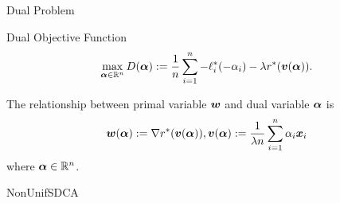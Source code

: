 \begin{frame}{Dual Problem}
\begin{block}{Dual Objective Function}
\begin{equation*}\label{eq:dual}
\max_{\bm{\alpha}\in \mathbb{R}^n} D(\bm{\alpha}):=\frac1n \sum_{i=1}^n -\ell_i^*(-\alpha_i) - \lambda r^*(\bm{v}(\bm{\alpha})).  
\end{equation*}
\end{block}
The relationship between primal variable $\bm{w}$ and dual variable $\bm{\alpha}$ is
\begin{equation*}\label{eq:wdualupdate}
    \bm{w}(\bm{\alpha}) := \nabla r^*(\bm{v}(\bm{\alpha})), \bm{v}(\bm{\alpha}):=\frac{1}{\lambda n} \sum_{i=1}^n \alpha_i\bm{x}_i
\end{equation*}
where $\bm{\alpha}\in \mathbb{R}^n$.
\end{frame}

\begin{frame}{NonUnifSDCA}
\begin{algorithm}[H]
    \label{alg:SDCA}
    \caption{Non-Uniform Stochastic Dual Coordinate Ascent}
    \SetAlgoLined
\end{algorithm}
\end{frame}
